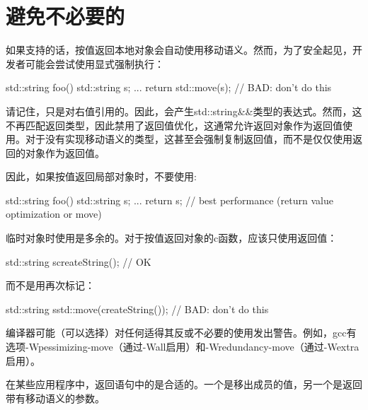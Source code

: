 \section{避免不必要的}
如果支持的话，按值返回本地对象会自动使用移动语义。然而，为了安全起见，开发者可能会尝试使用显式强制执行：

\begin{cppcode}
std::string foo()
{
	std::string s;
	...
	return std::move(s); // BAD: don’t do this
}
\end{cppcode}

请记住，只是对右值引用的。因此，会产生std::string\&\&类型的表达式。然而，这不再匹配返回类型，因此禁用了返回值优化，这通常允许返回对象作为返回值使用。对于没有实现移动语义的类型，这甚至会强制复制返回值，而不是仅仅使用返回的对象作为返回值。

因此，如果按值返回局部对象时，不要使用:

\begin{cppcode}
std::string foo()
{
	std::string s;
	...
	return s; // best performance (return value optimization or move)
}
\end{cppcode}

临时对象时使用是多余的。对于按值返回对象的c函数，应该只使用返回值：

\begin{cppcode}
std::string s{createString()}; // OK
\end{cppcode}

而不是用再次标记：

\begin{cppcode}
std::string s{std::move(createString())}; // BAD: don’t do this
\end{cppcode}

编译器可能（可以选择）对任何适得其反或不必要的使用发出警告。例如，gcc有选项-Wpessimizing-move（通过-Wall启用）和-Wredundancy-move（通过-Wextra启用）。

在某些应用程序中，返回语句中的是合适的。一个是移出成员的值，另一个是返回带有移动语义的参数。
















